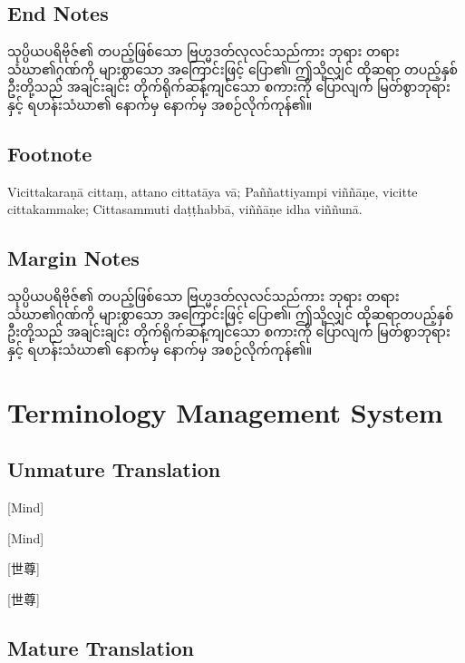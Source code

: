 \subsection{End Notes}
သုပ္ပိယပရိဗိုဇ်၏ တပည့်ဖြစ်သော ဗြဟ္မဒတ်လုလင်သည်ကား ဘုရား တရား သံဃာ၏ဂုဏ်ကို များစွာသော အကြောင်းဖြင့် ပြော၏၊ ဤသို့လျှင် ထိုဆရာ တပည့်နှစ်ဦးတို့သည် အချင်းချင်း တိုက်ရိုက်ဆန့်ကျင်သော စကားကို ပြောလျက် မြတ်စွာဘုရားနှင့် ရဟန်းသံဃာ၏ နောက်မှ နောက်မှ အစဉ်လိုက်ကုန်၏။

\subsection{Footnote}
Vicittakaraṇā cittaṃ, attano cittatāya vā;
Paññattiyampi viññāṇe, vicitte cittakammake;
Cittasammuti daṭṭhabbā, viññāṇe idha viññunā.


\subsection{Margin Notes}
သုပ္ပိယပရိဗိုဇ်၏ တပည့်ဖြစ်သော ဗြဟ္မဒတ်လုလင်သည်ကား ဘုရား တရား သံဃာ၏ဂုဏ်ကို များစွာသော အကြောင်းဖြင့် ပြော၏၊ ဤသို့လျှင် ထိုဆရာတပည့်နှစ်ဦးတို့သည် အချင်းချင်း တိုက်ရိုက်ဆန့်ကျင်သော စကားကို ပြောလျက် မြတ်စွာဘုရားနှင့် ရဟန်းသံဃာ၏ နောက်မှ နောက်မှ အစဉ်လိုက်ကုန်၏။

\section{Terminology Management System}
\subsection{Unmature Translation}

[Mind]


[Mind]


[世尊]


[世尊]

\subsection{Mature Translation}



